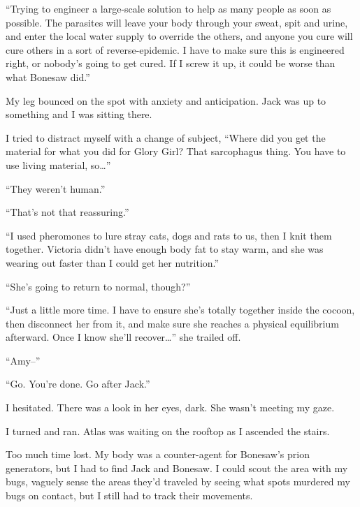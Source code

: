 ``Trying to engineer a large-scale solution to help as many people as soon as possible.  The parasites will leave your body through your sweat, spit and urine, and enter the local water supply to override the others, and anyone you cure will cure others in a sort of reverse-epidemic.  I have to make sure this is engineered right, or nobody's going to get cured.  If I screw it up, it could be worse than what Bonesaw did.''



My leg bounced on the spot with anxiety and anticipation.  Jack was up to something and I was sitting there.



I tried to distract myself with a change of subject, ``Where did you get the material for what you did for Glory Girl?  That sarcophagus thing.  You have to use living material, so\ldots''



``They weren't human.''



``That's not that reassuring.''



``I used pheromones to lure stray cats, dogs and rats to us, then I knit them together.  Victoria didn't have enough body fat to stay warm, and she was wearing out faster than I could get her nutrition.''



``She's going to return to normal, though?''



``Just a little more time.  I have to ensure she's totally together inside the cocoon, then disconnect her from it, and make sure she reaches a physical equilibrium afterward.  Once I know she'll recover\ldots'' she trailed off.



``Amy--''



``Go.  You're done.  Go after Jack.''



I hesitated.  There was a look in her eyes, dark.  She wasn't meeting my gaze.



I turned and ran.  Atlas was waiting on the rooftop as I ascended the stairs.



Too much time lost.  My body was a counter-agent for Bonesaw's prion generators, but I had to find Jack and Bonesaw.  I could scout the area with my bugs, vaguely sense the areas they'd traveled by seeing what spots murdered my bugs on contact, but I still had to track their movements.



